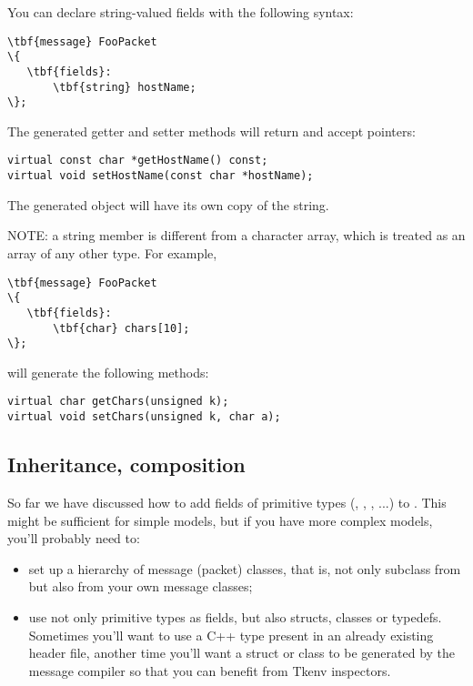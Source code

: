 You can declare string-valued fields with the following syntax:

\begin{Verbatim}[commandchars=\\\{\}]
\tbf{message} FooPacket
\{
   \tbf{fields}:
       \tbf{string} hostName;
\};
\end{Verbatim}

The generated getter and setter methods will return and accept 
pointers:

\begin{verbatim}
virtual const char *getHostName() const;
virtual void setHostName(const char *hostName);
\end{verbatim}

The generated object will have its own copy of the string.

NOTE: a string member is different from a character array,
which is treated as an array of any other type. For example,

\begin{Verbatim}[commandchars=\\\{\}]
\tbf{message} FooPacket
\{
   \tbf{fields}:
       \tbf{char} chars[10];
\};
\end{Verbatim}

will generate the following methods:

\begin{verbatim}
virtual char getChars(unsigned k);
virtual void setChars(unsigned k, char a);
\end{verbatim}


\subsection{Inheritance, composition}

So far we have discussed how to add fields of primitive types
(, , , ...) to .
This might be sufficient for simple models, but if you have
more complex models, you'll probably need to:

\begin{itemize}
  \item set up a hierarchy of message (packet) classes, that is,
    not only subclass from  but also from your
    own message classes;
  \item use not only primitive types as fields, but also structs,
    classes or typedefs. Sometimes you'll want to use a C++ type
    present in an already existing header file, another time you'll
    want a struct or class to be generated by the message
    compiler so that you can benefit from Tkenv inspectors.
\end{itemize}

